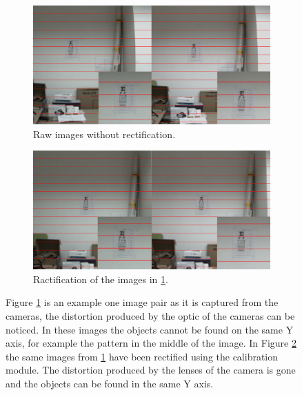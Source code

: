 \documentclass[10pt,a4paper,twocolumn,twoside]{article}
\begin{document}
	\begin{figure}
		\centering
		\begin{subfigure}[t]{0.5\textwidth}
			\centering
			\includegraphics[width=\linewidth]{img/regular2z.png}
			\caption{Raw images without rectification.}
			\label{fig:rec:regular}
		\end{subfigure}%
	\vspace{1cm}
		\begin{subfigure}[t]{0.5\textwidth}
			\centering
			\includegraphics[width=\linewidth]{img/rectified2z.png}
			\caption{Ractification of the images in \ref{fig:rec:regular}.}
			\label{fig:rec:ractified}
		\end{subfigure}
		\caption{Figure \ref{fig:rec:regular} is an example one image pair as it is captured from the cameras, the distortion produced by the optic of the cameras can be noticed. In these images the objects cannot be found on the same Y axis, for example the pattern in the middle of the image. In Figure \ref{fig:rec:ractified} the same images from \ref{fig:rec:regular} have been rectified using the calibration module. The distortion produced by the lenses of the camera is gone and the objects can be found in the same Y axis. }
		\label{fig:rec}
	\end{figure}
	
\end{document}
